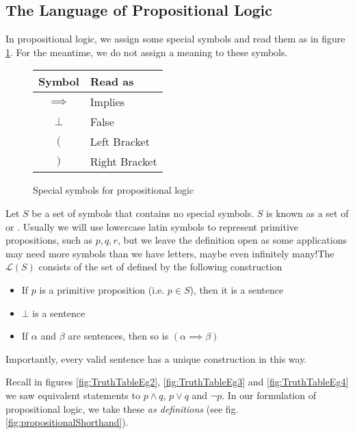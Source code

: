 \documentclass[11pt]{article}
\begin{document}
\subsection{The Language of Propositional Logic}
In propositional logic, we assign some special symbols and read them as in figure \ref{fig:specialSymbolsProp}. For the meantime, we do not assign a meaning to these symbols.
\begin{figure}[H]
    \caption{Special symbols for propositional logic}
    \label{fig:specialSymbolsProp}
    \centering
    \begin{tabular}{|c|l|}
        \hline
        Symbol & Read as \\ \hline \hline
        $\implies$ & Implies \\ \hline
        $\bot$ & False \\ \hline
        $($ & Left Bracket \\ \hline
        $)$ & Right Bracket \\ \hline
    \end{tabular}
\end{figure}
\begin{defi}
    Let $S$ be a set of symbols that contains no special symbols. $S$ is known as a set of  or . Usually we will use lowercase latin symbols to represent primitive propositions, such as $p,q,r$, but we leave the definition open as some applications may need more symbols than we have letters, maybe even infinitely many!\mypar The  $\mathcal{L}(S)$ consists of the set of  defined by the following construction
    \begin{itemize}
        \item If $p$ is a primitive proposition (i.e. $p \in S$), then it is a sentence
        \item $\bot$ is a sentence
        \item If $\alpha$ and $\beta$ are sentences, then so is $(\alpha \implies \beta)$
    \end{itemize}
    Importantly, every valid sentence has a unique construction in this way.
\end{defi}
\begin{sidenote}
    Recall in figures \ref{fig:TruthTableEg2}, \ref{fig:TruthTableEg3} and \ref{fig:TruthTableEg4} we saw  equivalent statements to $p \land q$, $p \lor q$ and $\neg p$. In our formulation of propositional logic, we take these \emph{as definitions} (see fig. \ref{fig:propositionalShorthand}).
\end{sidenote}
\end{document}
